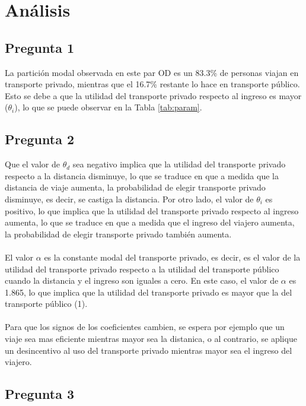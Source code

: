 \section{Análisis}

\subsection{Pregunta 1}

La partición modal observada en este par OD es un 83.3\% de personas viajan en transporte privado, mientras que el 16.7\% restante lo hace en transporte público. Esto se debe a que la utilidad del transporte privado respecto al ingreso es mayor ($\theta_{i}$), lo que se puede observar en la Tabla \ref{tab:param}.

\subsection{Pregunta 2}

Que el valor de $\theta_{d}$ sea negativo implica que la utilidad del transporte privado respecto a la distancia disminuye, lo que se traduce en que a medida que la distancia de viaje aumenta, la probabilidad de elegir transporte privado disminuye, es decir, se castiga la distancia.
Por otro lado, el valor de $\theta_{i}$ es positivo, lo que implica que la utilidad del transporte privado respecto al ingreso aumenta, lo que se traduce en que a medida que el ingreso del viajero aumenta, la probabilidad de elegir transporte privado también aumenta.
\\ \\
El valor $\alpha$ es la constante modal del transporte privado, es decir, es el valor de la utilidad del transporte privado respecto a la utilidad del transporte público cuando la distancia y el ingreso son iguales a cero. En este caso, el valor de $\alpha$ es 1.865, lo que implica que la utilidad del transporte privado es mayor que la del transporte público (1).
\\ \\
Para que los signos de los coeficientes cambien, se espera por ejemplo que un viaje sea mas eficiente mientras mayor sea la distanica, o al contrario, se aplique un desincentivo al uso del transporte privado mientras mayor sea el ingreso del viajero.

\subsection{Pregunta 3}



